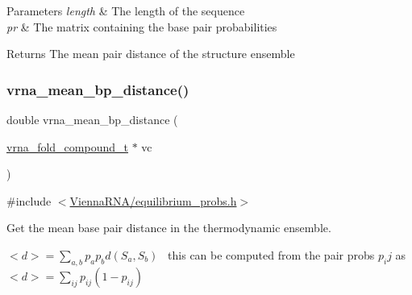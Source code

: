 \begin{DoxyParams}{Parameters}
{\em length} & The length of the sequence \\
\hline
{\em pr} & The matrix containing the base pair probabilities \\
\hline
\end{DoxyParams}
\begin{DoxyReturn}{Returns}
The mean pair distance of the structure ensemble 
\end{DoxyReturn}
\mbox{\label{group__pf__fold_gaa6b8983b559b9ef4b2e1b31113ea317b}} 
\subsubsection{\texorpdfstring{vrna\+\_\+mean\+\_\+bp\+\_\+distance()}{vrna\_mean\_bp\_distance()}}
{\footnotesize\ttfamily double vrna\+\_\+mean\+\_\+bp\+\_\+distance (\begin{DoxyParamCaption}\item[{\hyperlink{group__fold__compound_ga1b0cef17fd40466cef5968eaeeff6166}{vrna\+\_\+fold\+\_\+compound\+\_\+t} $\ast$}]{vc }\end{DoxyParamCaption})}



{\ttfamily \#include $<$\hyperlink{equilibrium__probs_8h}{Vienna\+R\+N\+A/equilibrium\+\_\+probs.\+h}$>$}



Get the mean base pair distance in the thermodynamic ensemble. 

$<d> = \sum_{a,b} p_a p_b d(S_a,S_b)$~\newline
this can be computed from the pair probs $p_ij$ as~\newline
 $<d> = \sum_{ij} p_{ij}(1-p_{ij})$



